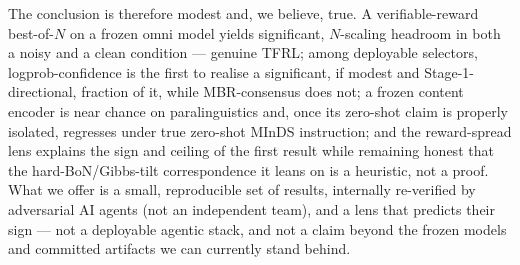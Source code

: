 The conclusion is therefore modest and, we believe, true. A verifiable-reward best-of-$N$ on a frozen
omni model yields significant, $N$-scaling headroom in both a noisy and a clean condition --- genuine
TFRL; among deployable selectors, logprob-confidence is the first to realise a significant, if modest and
Stage-1-directional, fraction of it, while MBR-consensus does not; a frozen content encoder is near
chance on paralinguistics and, once its zero-shot claim is properly isolated, regresses under true
zero-shot MInDS instruction; and the reward-spread lens explains the sign and ceiling of the first result
while remaining honest that the hard-BoN/Gibbs-tilt correspondence it leans on is a heuristic, not a
proof. What we offer is a small, reproducible set of results, internally re-verified by adversarial AI
agents (not an independent team), and a lens that predicts their sign --- not a deployable agentic
stack, and not a claim beyond the frozen models and committed artifacts we can currently stand behind.